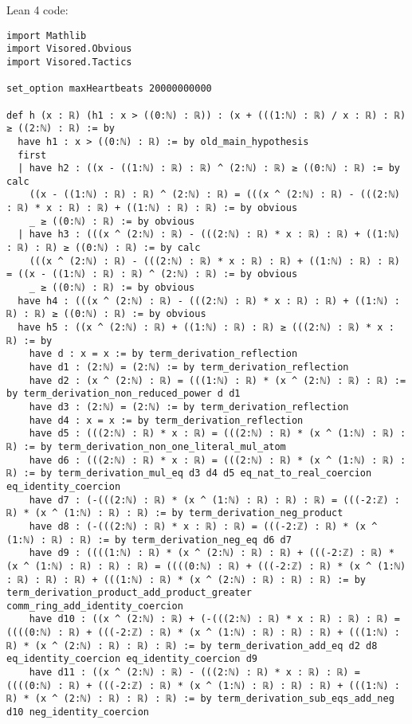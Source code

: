 \documentclass{article}
\begin{document}
Lean 4 code:
\begin{tcolorbox}[colback=white!10, width=\linewidth]
\begin{lstlisting}[language=Lean4]
import Mathlib
import Visored.Obvious
import Visored.Tactics

set_option maxHeartbeats 20000000000

def h (x : ℝ) (h1 : x > ((0:ℕ) : ℝ)) : (x + (((1:ℕ) : ℝ) / x : ℝ) : ℝ) ≥ ((2:ℕ) : ℝ) := by
  have h1 : x > ((0:ℕ) : ℝ) := by old_main_hypothesis
  first
  | have h2 : ((x - ((1:ℕ) : ℝ) : ℝ) ^ (2:ℕ) : ℝ) ≥ ((0:ℕ) : ℝ) := by calc
    ((x - ((1:ℕ) : ℝ) : ℝ) ^ (2:ℕ) : ℝ) = (((x ^ (2:ℕ) : ℝ) - (((2:ℕ) : ℝ) * x : ℝ) : ℝ) + ((1:ℕ) : ℝ) : ℝ) := by obvious
    _ ≥ ((0:ℕ) : ℝ) := by obvious
  | have h3 : (((x ^ (2:ℕ) : ℝ) - (((2:ℕ) : ℝ) * x : ℝ) : ℝ) + ((1:ℕ) : ℝ) : ℝ) ≥ ((0:ℕ) : ℝ) := by calc
    (((x ^ (2:ℕ) : ℝ) - (((2:ℕ) : ℝ) * x : ℝ) : ℝ) + ((1:ℕ) : ℝ) : ℝ) = ((x - ((1:ℕ) : ℝ) : ℝ) ^ (2:ℕ) : ℝ) := by obvious
    _ ≥ ((0:ℕ) : ℝ) := by obvious
  have h4 : (((x ^ (2:ℕ) : ℝ) - (((2:ℕ) : ℝ) * x : ℝ) : ℝ) + ((1:ℕ) : ℝ) : ℝ) ≥ ((0:ℕ) : ℝ) := by obvious
  have h5 : ((x ^ (2:ℕ) : ℝ) + ((1:ℕ) : ℝ) : ℝ) ≥ (((2:ℕ) : ℝ) * x : ℝ) := by
    have d : x = x := by term_derivation_reflection
    have d1 : (2:ℕ) = (2:ℕ) := by term_derivation_reflection
    have d2 : (x ^ (2:ℕ) : ℝ) = (((1:ℕ) : ℝ) * (x ^ (2:ℕ) : ℝ) : ℝ) := by term_derivation_non_reduced_power d d1
    have d3 : (2:ℕ) = (2:ℕ) := by term_derivation_reflection
    have d4 : x = x := by term_derivation_reflection
    have d5 : (((2:ℕ) : ℝ) * x : ℝ) = (((2:ℕ) : ℝ) * (x ^ (1:ℕ) : ℝ) : ℝ) := by term_derivation_non_one_literal_mul_atom
    have d6 : (((2:ℕ) : ℝ) * x : ℝ) = (((2:ℕ) : ℝ) * (x ^ (1:ℕ) : ℝ) : ℝ) := by term_derivation_mul_eq d3 d4 d5 eq_nat_to_real_coercion eq_identity_coercion
    have d7 : (-(((2:ℕ) : ℝ) * (x ^ (1:ℕ) : ℝ) : ℝ) : ℝ) = (((-2:ℤ) : ℝ) * (x ^ (1:ℕ) : ℝ) : ℝ) := by term_derivation_neg_product
    have d8 : (-(((2:ℕ) : ℝ) * x : ℝ) : ℝ) = (((-2:ℤ) : ℝ) * (x ^ (1:ℕ) : ℝ) : ℝ) := by term_derivation_neg_eq d6 d7
    have d9 : ((((1:ℕ) : ℝ) * (x ^ (2:ℕ) : ℝ) : ℝ) + (((-2:ℤ) : ℝ) * (x ^ (1:ℕ) : ℝ) : ℝ) : ℝ) = ((((0:ℕ) : ℝ) + (((-2:ℤ) : ℝ) * (x ^ (1:ℕ) : ℝ) : ℝ) : ℝ) + (((1:ℕ) : ℝ) * (x ^ (2:ℕ) : ℝ) : ℝ) : ℝ) := by term_derivation_product_add_product_greater comm_ring_add_identity_coercion
    have d10 : ((x ^ (2:ℕ) : ℝ) + (-(((2:ℕ) : ℝ) * x : ℝ) : ℝ) : ℝ) = ((((0:ℕ) : ℝ) + (((-2:ℤ) : ℝ) * (x ^ (1:ℕ) : ℝ) : ℝ) : ℝ) + (((1:ℕ) : ℝ) * (x ^ (2:ℕ) : ℝ) : ℝ) : ℝ) := by term_derivation_add_eq d2 d8 eq_identity_coercion eq_identity_coercion d9
    have d11 : ((x ^ (2:ℕ) : ℝ) - (((2:ℕ) : ℝ) * x : ℝ) : ℝ) = ((((0:ℕ) : ℝ) + (((-2:ℤ) : ℝ) * (x ^ (1:ℕ) : ℝ) : ℝ) : ℝ) + (((1:ℕ) : ℝ) * (x ^ (2:ℕ) : ℝ) : ℝ) : ℝ) := by term_derivation_sub_eqs_add_neg d10 neg_identity_coercion

\end{lstlisting}
\end{tcolorbox}
\end{document}
